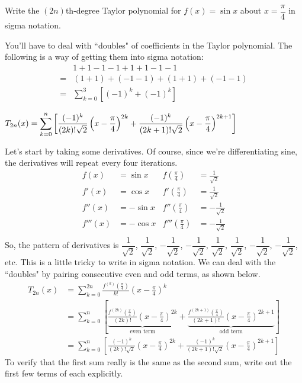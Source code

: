 \begin{question}
Write the $(2n)$th-degree Taylor polynomial for $f(x)=\sin x$ about $x=\dfrac{\pi}{4}$ in sigma notation.
\end{question}
\begin{hint}
You'll have to deal with ``doubles" of coefficients in the Taylor polynomial. The following is a way of getting them into sigma notation:
\begin{align*}
&1+1-1-1+1+1-1-1  \\
= &(1+1)+(-1-1)+(1+1)+(-1-1)\\
=&\sum_{k=0}^3 \left[(-1)^k+(-1)^k\right]\end{align*}
\end{hint}
\begin{answer}
$T_{2n}(x)=\displaystyle\sum_{k=0}^n \left[\dfrac{(-1)^k}{(2k)!\sqrt{2}}\left(x-\frac{\pi}{4}\right)^{2k}
+
\dfrac{(-1)^k}{(2k+1)!\sqrt{2}}\left(x-\frac{\pi}{4}\right)^{2k+1}\right]$
\end{answer}
\begin{solution}
Let's start by taking some derivatives. Of course, since we're differentiating sine, the derivatives will repeat every four iterations.
\begin{align*}
f(x)&=\sin x & f\left(\frac{\pi}{4}\right)&=\frac{1}{\sqrt 2}\\
f'(x)&=\cos x & f'\left(\frac{\pi}{4}\right)&=\frac{1}{\sqrt{2}}\\
f''(x)&=-\sin x & f''\left(\frac{\pi}{4}\right)&=-\frac{1}{\sqrt 2}\\
f'''(x)&=-\cos x & f'''\left(\frac{\pi}{4}\right)&=-\frac{1}{\sqrt{2}}\\
\end{align*}
So, the pattern of derivatives is $\dfrac{1}{\sqrt{2}}$, $\dfrac{1}{\sqrt{2}}$, $-\dfrac{1}{\sqrt{2}}$, $-\dfrac{1}{\sqrt{2}}$, $\dfrac{1}{\sqrt{2}}$, $\dfrac{1}{\sqrt{2}}$, $-\dfrac{1}{\sqrt{2}}$, $-\dfrac{1}{\sqrt{2}}$, etc. This is a little tricky to write in sigma notation. We can deal with the ``doubles" by pairing consecutive even and odd terms, as shown below.
\begin{align*}
T_{2n}(x)&=\sum_{k=0}^{2n} \frac{f^{(k)}\left(\frac{\pi}{4}\right)}{k!}\left(x-\frac{\pi}{4}\right)^k\\
&=\sum_{k=0}^{n} \left[
\underbrace{\frac{f^{(2k)}\left(\frac{\pi}{4}\right)}{(2k)!}\left(x-\frac{\pi}{4}\right)^{2k}}_{\mbox{even term}}
+
\underbrace{\frac{f^{(2k+1)}\left(\frac{\pi}{4}\right)}{(2k+1)!}\left(x-\frac{\pi}{4}\right)^{2k+1}}_{\mbox{odd term}}\right]\\
&=\sum_{k=0}^n \left[\frac{(-1)^k}{(2k)!\sqrt{2}}\left(x-\frac{\pi}{4}\right)^{2k}
+
\frac{(-1)^k}{(2k+1)!\sqrt{2}}\left(x-\frac{\pi}{4}\right)^{2k+1}\right]
\end{align*}
To verify that the first sum really is the same as the second
            sum, write out the first few terms of each explicitly.
\end{solution}


